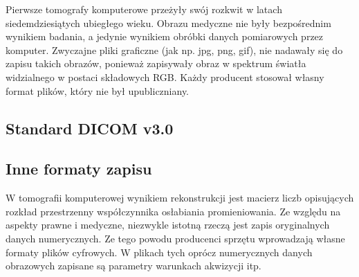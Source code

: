 
\par
Pierwsze tomografy komputerowe przeżyły swój rozkwit w latach siedemdziesiątych ubiegłego wieku.
Obrazu medyczne nie były bezpośrednim wynikiem badania, a jedynie wynikiem obróbki danych pomiarowych przez komputer.
Zwyczajne pliki graficzne (jak np. jpg, png, gif), nie nadawały się do zapisu takich obrazów, ponieważ zapisywały obraz w spektrum światła widzialnego w postaci składowych RGB.
Każdy producent stosował  własny format plików, który nie był upubliczniany.

\subsection{Standard DICOM v3.0}


\subsection{Inne formaty zapisu}

\par
W tomografii komputerowej wynikiem rekonstrukcji jest macierz liczb opisujących rozkład przestrzenny współczynnika osłabiania promieniowania.
Ze względu na aspekty prawne i medyczne, niezwykle istotną rzeczą jest zapis oryginalnych danych numerycznych. Ze tego powodu producenci sprzętu wprowadzają własne formaty plików cyfrowych.
W plikach tych oprócz numerycznych danych obrazowych zapisane są parametry warunkach akwizycji itp.